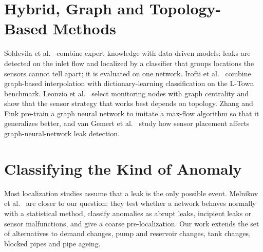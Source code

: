\documentclass[11pt,letterpaper]{report}
\theoremstyle{definition}
\theoremstyle{plain}
\theoremstyle{remark}
\begin{document}
\section{Hybrid, Graph and Topology-Based Methods}
Soldevila et al.\ \cite{soldevila2022hybrid} combine expert knowledge with data-driven models: leaks are detected on the inlet flow and localized by a classifier that groups locations the sensors cannot tell apart; it is evaluated on one network. Irofti et al.\ \cite{irofti2021dictionary} combine graph-based interpolation with dictionary-learning classification on the L-Town benchmark. Leonzio et al.\ \cite{leonzio2026centrality} select monitoring nodes with graph centrality and show that the sensor strategy that works best depends on topology. Zhang and Fink \cite{zhang2026aignn} pre-train a graph neural network to imitate a max-flow algorithm so that it generalizes better, and van Gemert et al.\ \cite{vangemert2026sensorplacement} study how sensor placement affects graph-neural-network leak detection.

\section{Classifying the Kind of Anomaly}
Most localization studies assume that a leak is the only possible event. Melnikov et al.\ \cite{melnikov2025sicams} are closer to our question: they test whether a network behaves normally with a statistical method, classify anomalies as abrupt leaks, incipient leaks or sensor malfunctions, and give a coarse pre-localization. Our work extends the set of alternatives to demand changes, pump and reservoir changes, tank changes, blocked pipes and pipe ageing.
\end{document}
